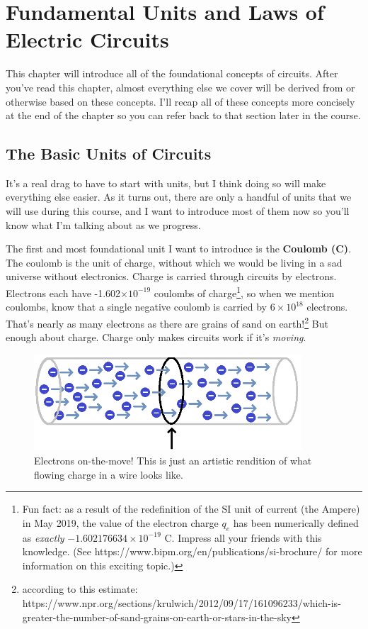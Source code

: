 \chapter{Fundamental Units and Laws of Electric Circuits}
\label{chap:fundamentals}
This chapter will introduce all of the foundational concepts of circuits. After you've read this chapter, almost everything else we cover will be derived from or otherwise based on these concepts. I'll recap all of these concepts more concisely at the end of the chapter so you can refer back to that section later in the course.

\section{The Basic Units of Circuits}
It's a real drag to have to start with units, but I think doing so will make everything else easier. As it turns out, there are only a handful of units that we will use during this course, and I want to introduce most of them now so you'll know what I'm talking about as we progress.
\par
The first and most foundational unit I want to introduce is the \textbf{Coulomb (C)}. The coulomb is the unit of charge, without which we would be living in a sad universe without electronics. Charge is carried through circuits by electrons. Electrons each have -1.602$\times10^{-19}$ coulombs of charge\footnote{Fun fact: as a result of the redefinition of the SI unit of current (the Ampere) in May 2019, the value of the electron charge $q_e$ has been numerically defined as \textit{exactly} $-1.602176634\times10^{-19}$ C. Impress all your friends with this knowledge. (See https://www.bipm.org/en/publications/si-brochure/ for more information on this exciting topic.)}, so when we mention coulombs, know that a single negative coulomb is carried by $6\times10^{18}$ electrons. That's nearly as many electrons as there are grains of sand on earth!\footnote{according to this estimate:
https://www.npr.org/sections/krulwich/2012/09/17/161096233/which-is-greater-the-number-of-sand-grains-on-earth-or-stars-in-the-sky
} But enough about charge. Charge only makes circuits work if it's \textit{moving}.
\par
\begin{figure}[h!]
\centering
\includegraphics[width=10cm]{figures/electronFlow.png}
\caption{Electrons on-the-move! This is just an artistic rendition of what flowing charge in a wire looks like.}
\label{movingChargeThroughHoop}
\end{figure}
